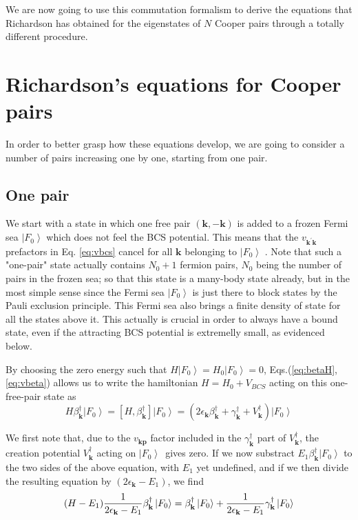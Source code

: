 \documentclass[aps,prb,superscriptaddress,twocolumn]{revtex4}
\newcommand{\vk}{\ensuremath{\mathbf{k}}}
\begin{document}
We are now going to use this commutation formalism to derive the equations that Richardson has obtained for the eigenstates of $N$ Cooper pairs through a totally different procedure.

\section{Richardson's equations for Cooper pairs\label{sec:rich}}

In order to better grasp how these equations develop, we are going to consider a number of pairs increasing one by one, starting from one pair.

\subsection{One pair}

We start with a state in which one free pair $(\mathbf{k} ,-\mathbf{k} )$ is added to a
frozen Fermi sea $\left|F_0\right> $ which does not feel the BCS potential.
This means that the $v_{\mathbf{k} ^{\prime}\mathbf{k} }$ prefactors in Eq.%
\eqref{eq:vbcs} cancel for all $\mathbf{k} $ belonging to $\left|F_0\right> $%
. Note that such a "one-pair" state actually contains $N_0+1$ fermion pairs, 
$N_0$ being the number of pairs in the frozen sea; so that this state is a many-body state already, but in the most simple sense since the Fermi sea $%
\left|F_0\right> $ is just there to block states by the Pauli exclusion
principle. This Fermi sea also brings a finite density of state for all the
states above it. This actually is crucial in order to always have a bound state,
even if the attracting BCS potential is extremelly small, as evidenced below.

By choosing the zero energy such
that $H\left|F_0\right> =H_0\left|F_0\right> =0$, Eqs.(\ref{eq:betaH},\ref{eq:vbeta}) allows us to write the hamiltonian $H=H_0+V_{BCS}$
acting on this one-free-pair state as 
\begin{equation}
H\beta^{\dagger}_\vk\left|F_0\right>  =\left[H,\beta^{\dagger}_\vk\right] 
\left|F_0\right> 
=\left(2\epsilon_\vk\beta^{\dagger}_\vk+\gamma^{\dagger}_\vk+V^{\dagger}_\vk%
\right) \left|F_0\right>  
\end{equation}

We first note that, due to the $v_{\mathbf{k} \mathbf{p} }$ factor included
in the $\gamma^{\dagger}_{\mathbf{k} }$ part of $V^{\dagger}_\vk$, 
the creation potential $V^{\dagger}_\vk$ acting on $%
\left|F_0\right> ${\ }gives zero.
If we now substract $E _1\beta^{\dagger}_\vk\left|F_0\right>  $ to
the two sides of the above equation, with $E_1$ yet undefined, and if we then divide the resulting equation by $%
\left(2\epsilon_\vk-E _1\right) $, we find 
\begin{equation}  \label{eq:HE1}
 (H-E_1)\frac{1}{2\epsilon_\vk-E _1} \beta^{\dagger}_\vk%
\left|F_0\right>  =\beta^{\dagger}_\vk\left|F_0\right>  +\frac{1}{%
2\epsilon_\vk-E _1} \gamma^{\dagger}_\vk\left|F_0\right>  
\end{equation}
\end{document}
